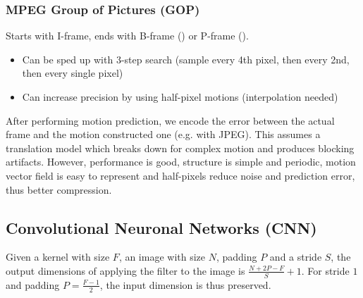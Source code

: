 \documentclass[a4paper,10pt]{article}
\begin{document}
\subsubsection{MPEG Group of Pictures (GOP)} Starts with I-frame, ends with B-frame () or P-frame ().
\begin{itemize}
    \item Can be sped up with 3-step search (sample every 4th pixel, then every 2nd, then every single pixel)
    \item Can increase precision by using half-pixel motions (interpolation needed)
\end{itemize}
After performing motion prediction, we encode the error between the actual frame and the motion constructed one (e.g. with JPEG). This assumes a translation model which breaks down for complex motion and produces blocking artifacts. However, performance is good, structure is simple and periodic, motion vector field is easy to represent and half-pixels reduce noise and prediction error, thus better compression.

\subsection{Convolutional Neuronal Networks (CNN)}
Given a kernel with size \(F\), an image with size \(N\), padding \(P\) and a stride \(S\), the output dimensions of applying the filter to the image is \(\frac{N + 2P - F}{S} + 1\). For stride \(1\) and padding \(P = \frac{F - 1}{2}\), the input dimension is thus preserved.
\end{document}
